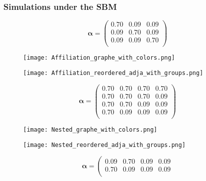 \documentclass[nopagenumber,9pt]{beamer}
\newcommand{\balpha}{\boldsymbol{\alpha}}
\begin{document}
\begin{frame}
 \frametitle{Simulations under the SBM}
 \vspace{-.2cm}
 
\begin{figure}
\begin{minipage}[c]{0.32\linewidth}
\tiny{$$\balpha=\left(
\begin{array}{rrr}
 0.70 & 0.09 & 0.09 \\ 
 0.09 & 0.70 & 0.09 \\ 
 0.09 & 0.09 & 0.70 \\ \end{array}\right)
$$}
\end{minipage}\hfill
\begin{minipage}[c]{0.32\linewidth}
\texttt{[image: Affiliation\_graphe\_with\_colors.png]}
\end{minipage}\hfill
\vspace{-.5cm}
\begin{minipage}[c]{0.32\linewidth}
\texttt{[image: Affiliation\_reordered\_adja\_with\_groups.png]}
\end{minipage}
\begin{minipage}[c]{0.32\linewidth}
\tiny{$$\balpha=\left(
\begin{array}{rrrr}
  0.70 & 0.70 & 0.70 & 0.70 \\ 
  0.70 & 0.70 & 0.70 & 0.09 \\ 
  0.70 & 0.70 & 0.09 & 0.09 \\ 
  0.70 & 0.09 & 0.09 & 0.09 \\ \end{array}\right)
$$}
\end{minipage}\hfill
\begin{minipage}[c]{0.32\linewidth}
\texttt{[image: Nested\_graphe\_with\_colors.png]}
\end{minipage}\hfill
\begin{minipage}[c]{0.32\linewidth}
\texttt{[image: Nested\_reordered\_adja\_with\_groups.png]}
\end{minipage}
\begin{minipage}[c]{0.32\linewidth}
\tiny{$$\balpha=\left(
\begin{array}{rrrr}
  0.09 & 0.70 & 0.09 & 0.09 \\ 
  0.70 & 0.09 & 0.09 & 0.09 \\ 

\end{array}$$}
\end{minipage}
\end{figure}
\end{frame}
\end{document}

